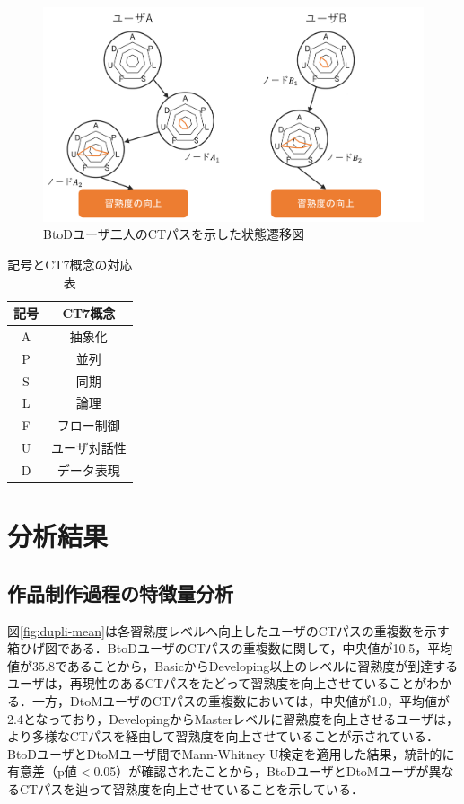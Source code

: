 \documentclass[11pt,dvipdfmx]{jreport}
\begin{document}
\begin{figure}[t]
	\centering
	\includegraphics[width=1.0\linewidth]{Okamoto_fig/digraph.pdf}
	\caption{BtoDユーザ二人のCTパスを示した状態遷移図}
	\label{fig:digraph}
\end{figure}

\begin{table}
  \caption{記号とCT7概念の対応表}
  \label{tab:ct-symobol}
  \vspace{2mm}
  \centering
  \begin{tabular}{c|c}
    \hline
    記号 & CT7概念\\
    \hline
    \hline
    A & 抽象化 \\
    \hline
    P & 並列 \\
    \hline
    S & 同期 \\
    \hline
    L & 論理 \\
    \hline
    F & フロー制御 \\
    \hline
    U & ユーザ対話性 \\
    \hline
    D & データ表現 \\
    \hline
  \end{tabular}
\end{table}




\section{分析結果}\label{sec:3-analysis}
\subsection{作品制作過程の特徴量分析}\label{subsec:path-analysis}
図\ref{fig:dupli-mean}は各習熟度レベルへ向上したユーザのCTパスの重複数を示す箱ひげ図である．BtoDユーザのCTパスの重複数に関して，中央値が10.5，平均値が35.8であることから，BasicからDeveloping以上のレベルに習熟度が到達するユーザは，再現性のあるCTパスをたどって習熟度を向上させていることがわかる．一方，DtoMユーザのCTパスの重複数においては，中央値が1.0，平均値が2.4となっており，DevelopingからMasterレベルに習熟度を向上させるユーザは，より多様なCTパスを経由して習熟度を向上させていることが示されている．BtoDユーザとDtoMユーザ間でMann-Whitney U検定\cite{Mann1947OnAT}を適用した結果，統計的に有意差（p値$<$0.05）が確認されたことから，BtoDユーザとDtoMユーザが異なるCTパスを辿って習熟度を向上させていることを示している．
\end{document}
